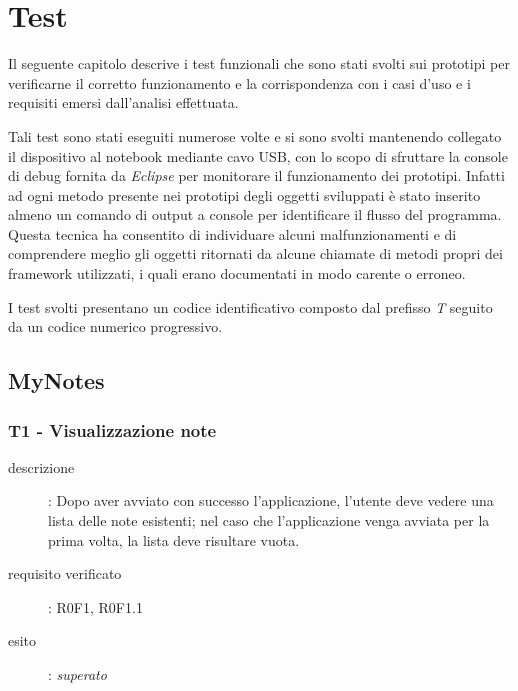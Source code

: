 \chapter{Test}\label{ch:test}
Il seguente capitolo descrive i test funzionali che sono stati svolti sui prototipi per verificarne il corretto funzionamento e la corrispondenza con i casi d'uso e i requisiti emersi dall'analisi effettuata.

Tali test sono stati eseguiti numerose volte e si sono svolti mantenendo collegato il dispositivo al notebook mediante cavo USB, con lo scopo di sfruttare la console di debug fornita da \emph{Eclipse} per monitorare il funzionamento dei prototipi.
Infatti ad ogni metodo presente nei prototipi degli oggetti sviluppati è stato inserito almeno un comando di output a console per identificare il flusso del programma.
Questa tecnica ha consentito di individuare alcuni malfunzionamenti e di comprendere meglio gli oggetti ritornati da alcune chiamate di metodi propri dei framework utilizzati, i quali erano documentati in modo carente o erroneo.

I test svolti presentano un codice identificativo composto dal prefisso \emph{T} seguito da un codice numerico progressivo.

\section{MyNotes}
\subsection{T1 - Visualizzazione note}
\begin{description}
\item[descrizione]: Dopo aver avviato con successo l'applicazione, l'utente deve vedere una lista delle note esistenti; nel caso che l'applicazione venga avviata per la prima volta, la lista deve risultare vuota.
\item[requisito verificato]: R0F1, R0F1.1
\item[esito]: \emph{superato}
\end{description}

